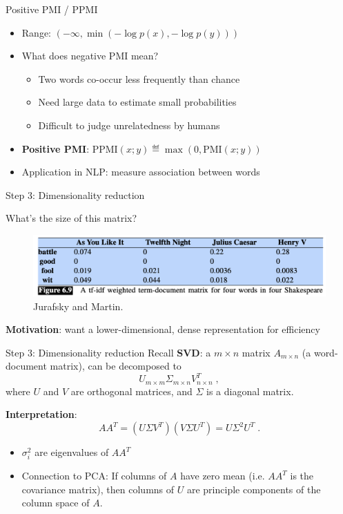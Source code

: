 \documentclass[usenames,dvipsnames,notes,11pt,aspectratio=169]{beamer}
\begin{document}
\begin{frame}
    {Positive PMI / PPMI}
    \begin{itemize}
        \itemsep1em
        \item Range: $(-\infty, \min(-\log p(x), -\log p(y)))$
        \item What does negative PMI mean?\pause
            \begin{itemize}
                \item Two words co-occur less frequently than chance
                \item Need large data to estimate small probabilities
                \item Difficult to judge unrelatedness by humans
            \end{itemize}
        \item {\bf Positive PMI}: $\text{PPMI}(x;y) \eqdef \max(0, \text{PMI}(x;y))$
        \item Application in NLP: measure association between words 
    \end{itemize}
\end{frame}

\begin{frame}
    {Step 3: Dimensionality reduction}

    What's the size of this matrix?
    \begin{figure}
            \includegraphics[width=\textwidth]{figures/term-doc-tfidf}
                    \caption{Jurafsky and Martin.}
    \end{figure}

    \pause
    \textbf{Motivation}: want a lower-dimensional, dense representation for efficiency
\end{frame}

\begin{frame}
    {Step 3: Dimensionality reduction}
    Recall \textbf{SVD}: a $m\times n$ matrix $A_{m\times n}$ (\eg a word-document matrix),
    can be decomposed to
    $$
    U_{m\times m}\Sigma_{m\times n}V_{n\times n}^T \;,
    $$
    where $U$ and $V$ are orthogonal matrices, and $\Sigma$ is a diagonal matrix.
    \pause

    \textbf{Interpretation}:
    $$
    AA^T = (U\Sigma V^T)(V\Sigma U^T) = U\Sigma^2 U^T \;.
    $$
    \vspace{-1em}
    \begin{itemize}
        \item $\sigma_i^2$ are eigenvalues of $AA^T$ 
        \item Connection to PCA: If columns of $A$ have zero mean (i.e. $AA^T$ is the covariance matrix), then columns of $U$ are principle components of the column space of $A$.
    \end{itemize}
\end{frame}
\end{document}
